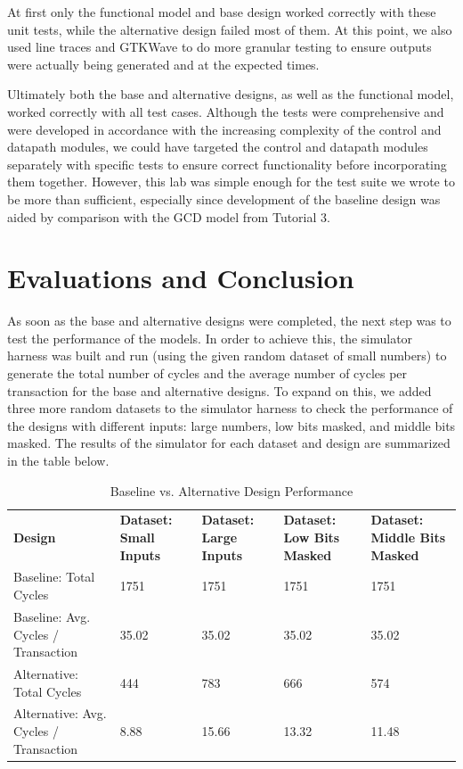 \documentclass[11pt]{article}
\begin{document}
At first only the functional model and base design worked correctly with these unit tests, while the alternative design failed most of them. At this point, we also used line traces and GTKWave to do more granular testing to ensure outputs were actually being generated and at the expected times. 

Ultimately both the base and alternative designs, as well as the functional model, worked correctly with all test cases. Although the tests were comprehensive and were developed in accordance with the increasing complexity of the control and datapath modules, we could have targeted the control and datapath modules separately with specific tests to ensure correct functionality before incorporating them together. However, this lab was simple enough for the test suite we wrote to be more than sufficient, especially since development of the baseline design was aided by comparison with the GCD model from Tutorial 3. 


\section{Evaluations and Conclusion}

As soon as the base and alternative designs were completed, the next step was to test the performance of the models. In order to achieve this, the simulator harness was built and run (using the given random dataset of small numbers) to generate the total number of cycles and the average number of cycles per transaction for the base and alternative designs. To expand on this, we added three more random datasets to the simulator harness to check the performance of the designs with different inputs: large numbers, low bits masked, and middle bits masked. The results of the simulator for each dataset and design are summarized in the table below.

\begin{table}[h]
\begin{tabular} {p{2cm} | p{3cm} | p{3cm} | p{3cm} | p{3cm} }

\hline
\textbf{Design}    & \textbf{Dataset: Small Inputs} & \textbf{Dataset: Large Inputs} & \textbf{Dataset: Low Bits Masked} & \textbf{Dataset: Middle Bits Masked} \\
Baseline: Total Cycles                    & 1751                           & 1751                           & 1751                       & 1751    \\
Baseline: Avg. Cycles / Transaction       & 35.02                          & 35.02                          & 35.02                      & 35.02   \\
Alternative: Total Cycles                 & 444                            & 783                            & 666                        & 574     \\
Alternative: Avg. Cycles / Transaction    & 8.88                           & 15.66                          & 13.32                      & 11.48   \\
\hline                    
\end{tabular}
\caption{Baseline vs. Alternative Design Performance}
\end{table}
\end{document}
